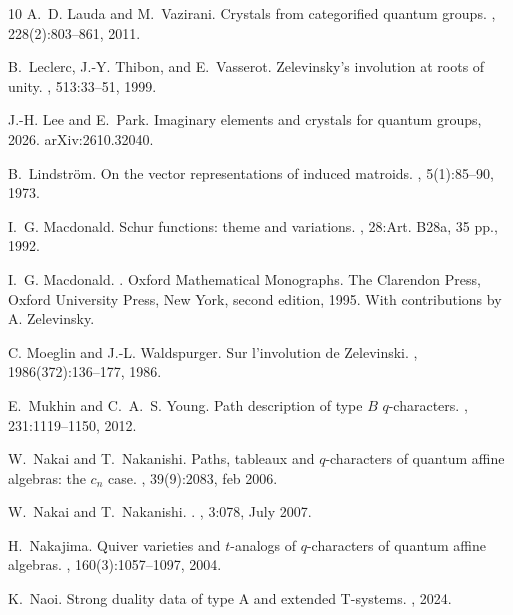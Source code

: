 \documentclass[11pt,reqno]{amsart}
\theoremstyle{definition} \newtheorem*{defn}{Definition}
\theoremstyle{definition}
\numberwithin{equation}{section}
\begin{document}
\begin{thebibliography}{10}
A.~D. Lauda and M.~Vazirani.
\newblock Crystals from categorified quantum groups.
, 228(2):803--861, 2011.

B.~Leclerc, J.-Y. Thibon, and E.~Vasserot.
\newblock Zelevinsky's involution at roots of unity.
, 513:33--51, 1999.

J.-H. Lee and E.~Park.
\newblock Imaginary elements and crystals for quantum groups, 2026.
\newblock arXiv:2610.32040.

B.~Lindström.
\newblock On the vector representations of induced matroids.
, 5(1):85--90, 1973.

I.~G. Macdonald.
\newblock Schur functions: theme and variations.
, 28:Art. B28a, 35 pp., 1992.

I.~G. Macdonald.
.
\newblock Oxford Mathematical Monographs. The Clarendon Press, Oxford University Press, New York, second edition, 1995.
\newblock With contributions by A. Zelevinsky.

C. Moeglin and J.-L. Waldspurger.
\newblock Sur l'involution de Zelevinski.
, 1986(372):136--177, 1986.

E.~Mukhin and C.~A.~S. Young.
\newblock Path description of type ${B}$ $q$-characters.
, 231:1119--1150, 2012.

W.~Nakai and T.~Nakanishi.
\newblock Paths, tableaux and $q$-characters of quantum affine algebras: the $c_n$ case.
, 39(9):2083, feb 2006.

W.~{Nakai} and T.~{Nakanishi}.
.
, 3:078, July 2007.

H.~Nakajima.
\newblock Quiver varieties and $t$-analogs of $q$-characters of quantum affine algebras.
, 160(3):1057--1097, 2004.

K.~Naoi.
\newblock Strong duality data of type {A} and extended {T}-systems.
, 2024.


\end{thebibliography}
\end{document}
